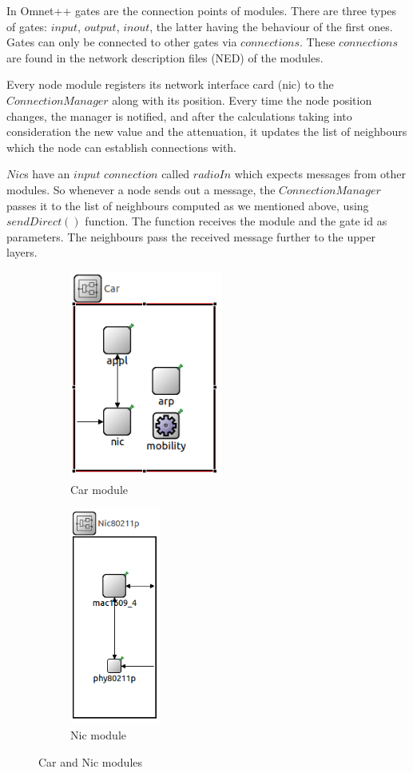 In Omnet++ gates are the connection points of modules. There are three types of
gates: $input$, $output$, $inout$, the latter having the behaviour of the first
ones. Gates can only be connected to other gates via $connections$. These
$connections$ are found in the network description files (NED) of the modules.

Every node module registers its network interface card (nic) to the
$ConnectionManager$ along with its position. Every time the node position
changes, the manager is notified, and after the calculations taking into
consideration the new value and the attenuation, it updates the list of
neighbours which the node can establish connections with.

$Nic$s have an $input$ $connection$ called $radioIn$ which expects messages from
other modules. So whenever a node sends out a message, the $ConnectionManager$
passes it to the list of neighbours computed as we mentioned above, using
$sendDirect()$ function. The function receives the module and the gate id as
parameters. The neighbours pass the received message further to the upper
layers.

\begin{figure}[bt]
 \centering
 \begin{subfigure}[b]{5cm}
 	\includegraphics[width=5cm]{img/CarNode}
 	\caption{Car module}
 	\label{fig:car}
 \end{subfigure}
 \begin{subfigure}[b]{5cm}
 	\includegraphics[width=3cm]{img/Nic80211p}
 	\caption{Nic module}%
 	\label{fig:nic}
 \end{subfigure}
 \caption{Car and Nic modules}
 \label{fig:car_nic}
\end{figure}

